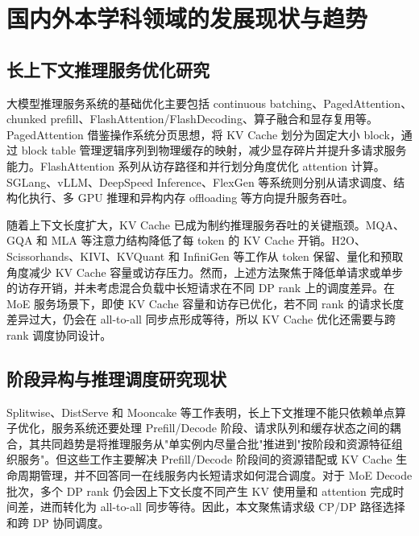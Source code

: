 \section{国内外本学科领域的发展现状与趋势}

\subsection{长上下文推理服务优化研究}

大模型推理服务系统的基础优化主要包括 continuous batching、PagedAttention、chunked prefill、FlashAttention/FlashDecoding、算子融合和显存复用等。PagedAttention 借鉴操作系统分页思想，将 KV Cache 划分为固定大小 block，通过 block table 管理逻辑序列到物理缓存的映射，减少显存碎片并提升多请求服务能力\citep{kwon2023efficient}。FlashAttention 系列从访存路径和并行划分角度优化 attention 计算\citep{dao2022flashattention,dao2023flashattention2,flashdecoding2023}。SGLang、vLLM、DeepSpeed Inference、FlexGen 等系统则分别从请求调度、结构化执行、多 GPU 推理和异构内存 offloading 等方向提升服务吞吐\citep{aminabadi2022deepspeedinference,sheng2023flexgen,zheng2023sglang}。

随着上下文长度扩大，KV Cache 已成为制约推理服务吞吐的关键瓶颈。MQA、GQA 和 MLA 等注意力结构降低了每 token 的 KV Cache 开销\citep{shazeer2019fast,ainslie2023gqa,deepseekai2024deepseekv2}。H2O、Scissorhands、KIVI、KVQuant 和 InfiniGen 等工作从 token 保留、量化和预取角度减少 KV Cache 容量或访存压力\citep{zhang2023h2o,liu2023scissorhands,liu2024kivi,hooper2024kvquant,lee2024infinigen}。然而，上述方法聚焦于降低单请求或单步的访存开销，并未考虑混合负载中长短请求在不同 DP rank 上的调度差异。在 MoE 服务场景下，即使 KV Cache 容量和访存已优化，若不同 rank 的请求长度差异过大，仍会在 all-to-all 同步点形成等待，所以 KV Cache 优化还需要与跨 rank 调度协同设计。

\subsection{阶段异构与推理调度研究现状}

Splitwise、DistServe 和 Mooncake 等工作表明，长上下文推理不能只依赖单点算子优化，服务系统还要处理 Prefill/Decode 阶段、请求队列和缓存状态之间的耦合，其共同趋势是将推理服务从"单实例内尽量合批"推进到"按阶段和资源特征组织服务"。但这些工作主要解决 Prefill/Decode 阶段间的资源错配或 KV Cache 生命周期管理，并不回答同一在线服务内长短请求如何混合调度。对于 MoE Decode 批次，多个 DP rank 仍会因上下文长度不同产生 KV 使用量和 attention 完成时间差，进而转化为 all-to-all 同步等待。因此，本文聚焦请求级 CP/DP 路径选择和跨 DP 协同调度。

